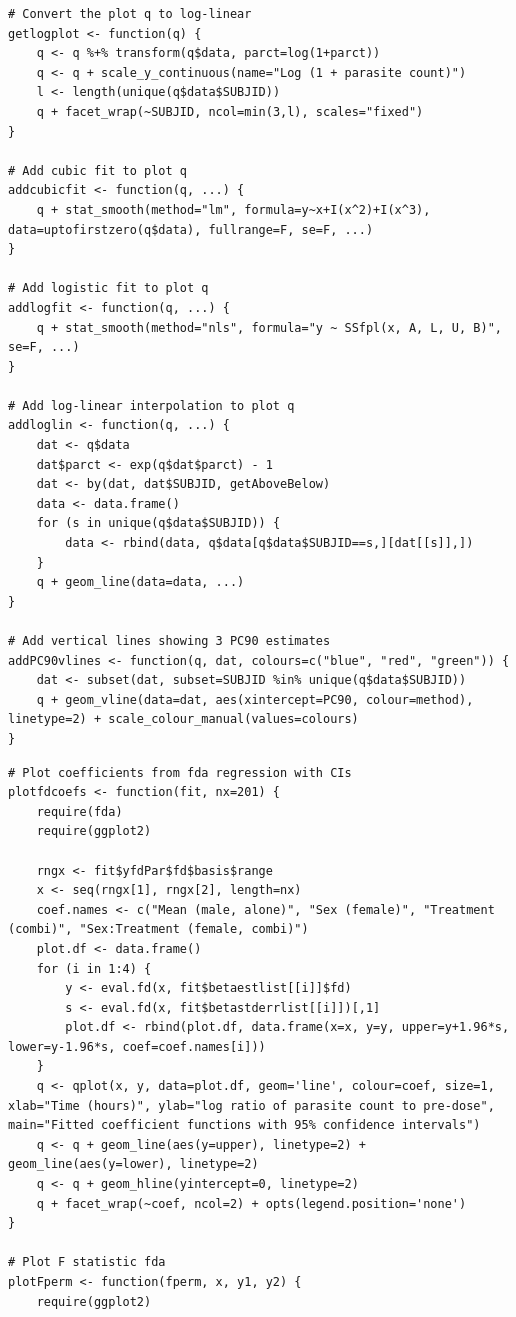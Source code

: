 \begin{singlespace}
\begin{lstlisting}[caption=Plot all 3 PC90 methods on same plot,label=R:comparePC90]
# Convert the plot q to log-linear
getlogplot <- function(q) {
	q <- q %+% transform(q$data, parct=log(1+parct))
	q <- q + scale_y_continuous(name="Log (1 + parasite count)")
	l <- length(unique(q$data$SUBJID))
	q + facet_wrap(~SUBJID, ncol=min(3,l), scales="fixed")
}

# Add cubic fit to plot q
addcubicfit <- function(q, ...) {
	q + stat_smooth(method="lm", formula=y~x+I(x^2)+I(x^3), data=uptofirstzero(q$data), fullrange=F, se=F, ...) 
}

# Add logistic fit to plot q
addlogfit <- function(q, ...) {
	q + stat_smooth(method="nls", formula="y ~ SSfpl(x, A, L, U, B)", se=F, ...)
}

# Add log-linear interpolation to plot q
addloglin <- function(q, ...) {
	dat <- q$data
	dat$parct <- exp(q$dat$parct) - 1
	dat <- by(dat, dat$SUBJID, getAboveBelow)
	data <- data.frame()
	for (s in unique(q$data$SUBJID)) {
		data <- rbind(data, q$data[q$data$SUBJID==s,][dat[[s]],])
	}
	q + geom_line(data=data, ...)
}

# Add vertical lines showing 3 PC90 estimates
addPC90vlines <- function(q, dat, colours=c("blue", "red", "green")) {
	dat <- subset(dat, subset=SUBJID %in% unique(q$data$SUBJID))
	q + geom_vline(data=dat, aes(xintercept=PC90, colour=method), linetype=2) + scale_colour_manual(values=colours)
}
\end{lstlisting}

\begin{lstlisting}[caption=Functional data analysis plots,label=R:fdaplot]
# Plot coefficients from fda regression with CIs
plotfdcoefs <- function(fit, nx=201) {
	require(fda)
	require(ggplot2)
	
	rngx <- fit$yfdPar$fd$basis$range
	x <- seq(rngx[1], rngx[2], length=nx)
	coef.names <- c("Mean (male, alone)", "Sex (female)", "Treatment (combi)", "Sex:Treatment (female, combi)")
	plot.df <- data.frame()
	for (i in 1:4) {
		y <- eval.fd(x, fit$betaestlist[[i]]$fd)
		s <- eval.fd(x, fit$betastderrlist[[i]])[,1]
		plot.df <- rbind(plot.df, data.frame(x=x, y=y, upper=y+1.96*s, lower=y-1.96*s, coef=coef.names[i]))
	}
	q <- qplot(x, y, data=plot.df, geom='line', colour=coef, size=1, xlab="Time (hours)", ylab="log ratio of parasite count to pre-dose", main="Fitted coefficient functions with 95% confidence intervals")
	q <- q + geom_line(aes(y=upper), linetype=2) + geom_line(aes(y=lower), linetype=2)
	q <- q + geom_hline(yintercept=0, linetype=2)
	q + facet_wrap(~coef, ncol=2) + opts(legend.position='none')
}

# Plot F statistic fda
plotFperm <- function(fperm, x, y1, y2) {
	require(ggplot2)
	

\end{lstlisting}
\end{singlespace}
